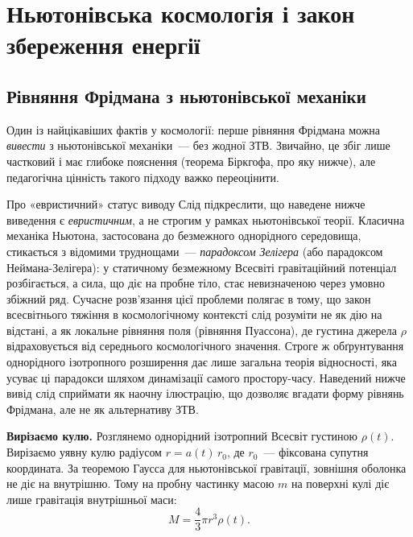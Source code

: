 
\chapter{Ньютонівська космологія і закон збереження енергії}
\label{app:newton_energy}

\section{Рівняння Фрідмана з ньютонівської механіки}

Один із найцікавіших фактів у космології: перше рівняння Фрідмана
можна \emph{вивести} з ньютонівської механіки~--- без жодної ЗТВ.
Звичайно, це збіг лише частковий і має глибоке пояснення
(теорема Біркгофа, про яку нижче), але педагогічна цінність
такого підходу важко переоцінити.

\begin{keybox}{Про «евристичний» статус виводу}
Слід підкреслити, що наведене нижче виведення є \emph{евристичним},
а не строгим у рамках ньютонівської теорії. Класична механіка
Ньютона, застосована до безмежного однорідного середовища,
стикається з відомими труднощами~--- \emph{парадоксом Зелігера}
(або парадоксом Неймана-Зелігера): у статичному безмежному
Всесвіті гравітаційний потенціал розбігається, а сила, що діє
на пробне тіло, стає невизначеною через умовно збіжний ряд.
Сучасне розв'язання цієї проблеми полягає в тому, що закон
всесвітнього тяжіння в космологічному контексті слід розуміти
не як дію на відстані, а як локальне рівняння поля (рівняння
Пуассона), де густина джерела $\rho$ відраховується від
середнього космологічного значення. Строге ж обґрунтування
однорідного ізотропного розширення дає лише загальна теорія
відносності, яка усуває ці парадокси шляхом динамізації
самого простору-часу. Наведений нижче вивід слід сприймати
як наочну ілюстрацію, що дозволяє вгадати форму рівнянь
Фрідмана, але не як альтернативу ЗТВ.
\end{keybox}

\textbf{Вирізаємо кулю.}
Розглянемо однорідний ізотропний Всесвіт густиною $\rho(t)$.
Вирізаємо уявну кулю радіусом $r = a(t)\,r_0$,
де $r_0$~--- фіксована супутня координата.
За теоремою Гаусса для ньютонівської гравітації,
зовнішня оболонка не діє на внутрішню.
Тому на пробну частинку масою $m$ на поверхні кулі діє лише
гравітація внутрішньої маси:
\[
  M = \frac{4}{3}\pi r^3 \rho(t).
\]


